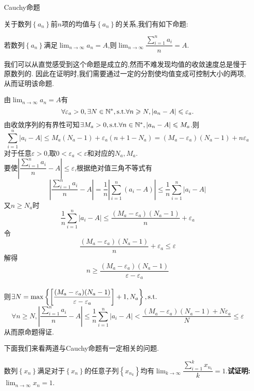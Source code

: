 \documentclass[a4paper]{ctexart}
\begin{document}
\pagestyle{empty}
\begin{center}
    \large Cauchy命题
\end{center}
关于数列$\left\{ a_n\right\}$前$n$项的均值与$\left\{ a_n\right\}$的关系,我们有如下命题:
\begin{formal}
    若数列$\left\{ a_n\right\}$满足$\displaystyle\lim_{n\to\infty}{a_n}=A$,则$\displaystyle\lim_{n\to\infty}{\dfrac{\sum_{i=1}^{n}{a_i}}{n}}=A$.
\end{formal}
\begin{analyze}[Analysis.]
    我们可以从直觉感受到这个命题是成立的,然而不难发现均值的收敛速度总是慢于原数列的.
    因此在证明时,我们需要通过一定的分割使均值变成可控制大小的两项,从而证明该命题.
\end{analyze}
\begin{solution}[Proof.]
    由$\displaystyle\lim_{n\to\infty}{a_n}=A$有
    $$\forall\varepsilon_a>0,\exists N\in\mathbb{N}^*,\text{s.t.}\forall n\geqslant N,\left\lvert a_n-A\right\rvert\leqslant\varepsilon_a.$$
    由收敛序列的有界性可知$\exists M_a>0,\text{s.t.}\forall n\in\mathbb{N}^*,\left|a_n-A\right|\leqslant M_a$.则
    $$\sum_{i=1}^{n}{\left\lvert a_i-A\right\rvert}\leqslant M_a(N_a-1)+\varepsilon_a(n+1-N_a)=(M_a-\varepsilon_a)(N_a-1)+n\varepsilon_a$$
    对于任意$\varepsilon>0$,取$0<\varepsilon_a<\varepsilon$和对应的$N_a,M_a$.\\
    要使$\left\lvert \dfrac{\sum_{i=1}^{n}{a_i}}{n}-A\right\rvert\leqslant\varepsilon$,根据绝对值三角不等式有
    $$\left\lvert \dfrac{\sum_{i=1}^{n}{a_i}}{n}-A\right\rvert=\dfrac{1}{n}\left\lvert \sum_{i=1}^{n}{(a_i-A)}\right\rvert\leqslant\dfrac{1}{n}\sum_{i=1}^{n}{\left\lvert a_i-A\right\rvert}$$
    又$n\geqslant N_a$时$$\dfrac{1}{n}\sum_{i=1}^{n}{\left\lvert a_i-A\right\rvert}\leqslant\dfrac{(M_a-\varepsilon_a)(N_a-1)}{n}+\varepsilon_a$$
    令$$\dfrac{(M_a-\varepsilon_a)(N_a-1)}{n}+\varepsilon_a\leqslant\varepsilon$$
    解得$$n\geqslant\dfrac{(M_a-\varepsilon_a)(N_a-1)}{\varepsilon-\varepsilon_a}$$\\
    则$\exists N=\max\left\{\left[\dfrac{(M_a-\varepsilon_a)(N_a-1)}{\varepsilon-\varepsilon_a}\right]+1,N_a\right\},\text{s.t.}$
    $$\forall n\geqslant N,\left\lvert \dfrac{\sum_{i=1}^{n}{a_i}}{n}-A\right\rvert
    \leqslant\dfrac{1}{n}\sum_{i=1}^{n}{\left\lvert a_i-A\right\rvert}<\dfrac{(M_a-\varepsilon_a)(N_a-1)+N\varepsilon_a}{N}\leqslant\varepsilon$$
    从而原命题得证.
\end{solution}\noindent
下面我们来看两道与Cauchy命题有一定相关的问题.
\begin{problem}[例1(24.10.09 SJTU数分小测).]
    数列$\left\{ x_n\right\}$满足对于$\left\{ x_n\right\}$的任意子列$\left\{ x_{n_k}\right\}$均有$\displaystyle\lim_{k\to\infty}{\dfrac{\sum_{i=1}^{k}{x_{n_i}}}{k}}=1$.\textbf{试证明:}$\displaystyle\lim_{n\to\infty}{x_n}=1$.
\end{problem}
\end{document}
